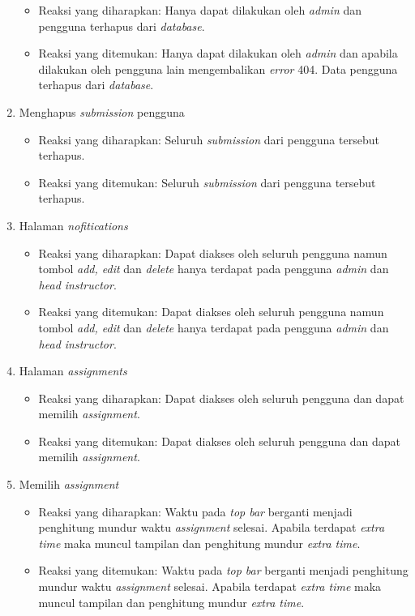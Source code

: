 \begin{enumerate}
	 \begin{itemize}
	 	\item Reaksi yang diharapkan: Hanya dapat dilakukan oleh \textit{admin} dan pengguna terhapus dari \textit{database}.
	 	\item Reaksi yang ditemukan: Hanya dapat dilakukan oleh \textit{admin} dan apabila dilakukan oleh pengguna lain mengembalikan \textit{error} 404. Data pengguna terhapus dari \textit{database}.
	 \end{itemize}
	 \item Menghapus \textit{submission} pengguna
	 \begin{itemize}
	 	\item Reaksi yang diharapkan: Seluruh \textit{submission} dari pengguna tersebut terhapus.
	 	\item Reaksi yang ditemukan: Seluruh \textit{submission} dari pengguna tersebut terhapus.
	 \end{itemize}
	 \item Halaman \textit{nofitications}
	 \begin{itemize}
	 	\item Reaksi yang diharapkan: Dapat diakses oleh seluruh pengguna namun tombol \textit{add, edit} dan \textit{delete} hanya terdapat pada pengguna \textit{admin} dan \textit{head instructor}.
	 	\item Reaksi yang ditemukan: Dapat diakses oleh seluruh pengguna namun tombol \textit{add, edit} dan \textit{delete} hanya terdapat pada pengguna \textit{admin} dan \textit{head instructor}.
	 \end{itemize}
	 \item Halaman \textit{assignments}
	 \begin{itemize}
	 	\item Reaksi yang diharapkan: Dapat diakses oleh seluruh pengguna dan dapat memilih \textit{assignment}.
	 	\item Reaksi yang ditemukan: Dapat diakses oleh seluruh pengguna dan dapat memilih \textit{assignment}.
	 \end{itemize}
	 \item Memilih \textit{assignment}
	 \begin{itemize}
	 	\item Reaksi yang diharapkan: Waktu pada \textit{top bar} berganti menjadi penghitung mundur waktu \textit{assignment} selesai. Apabila terdapat \textit{extra time} maka muncul tampilan dan penghitung mundur \textit{extra time}.
	 	\item Reaksi yang ditemukan: Waktu pada \textit{top bar} berganti menjadi penghitung mundur waktu \textit{assignment} selesai. Apabila terdapat \textit{extra time} maka muncul tampilan dan penghitung mundur \textit{extra time}.

\end{itemize}
\end{enumerate}
